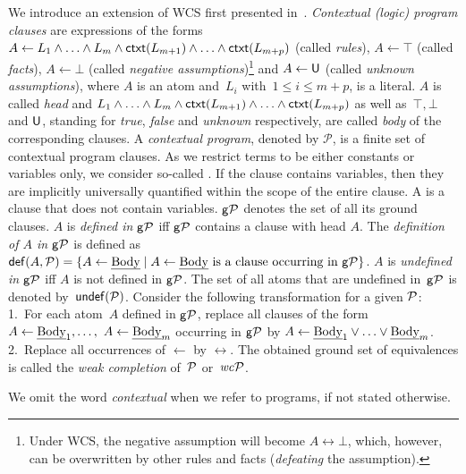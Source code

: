 \documentclass[12pt]{article}
\begin{document}
We introduce an extension of WCS first presented in~\cite{dietz:hoelldobler:pereira:2017}. 
\textit{Contextual (logic) program clauses}
are expressions of the forms $A  \leftarrow  L_1 \land \ldots \land L_m \land
\mathsf{ctxt}(L_{m+1}) \land \ldots \land \mathsf{ctxt}(L_{m+p})$ (called
\textit{rules}), $A \leftarrow \top$ (called \textit{facts}), $A \leftarrow \bot$ (called
\textit{negative assumptions})\footnote{Under WCS, the negative
assumption will become $A \leftrightarrow \bot$, which, however, can be overwritten by other rules and facts (\textit{defeating} the assumption).} and $A \leftarrow \mathsf{U}$ (called
\textit{unknown assumptions}), where
$A$ is an atom and~$L_i$ with~$1 \leq i \leq m+p$, is a literal.
$A$ is called \textit{head}
and $L_1 \land \ldots \land L_m \land
\mathsf{ctxt}(L_{m+1}) \land \ldots \land \mathsf{ctxt}(L_{m+p})$ as well as~$\top, \bot$
and $\mathsf{U}$,
standing for \textit{true}, \textit{false} and \textit{unknown} respectively, are
called \textit{body} of the corresponding clauses.  A
\textit{contextual program}, denoted by $\mathcal P$,
is a finite set of contextual program clauses.
As we restrict terms to be either constants or variables only, we consider so-called .
If the clause contains variables, then they are implicitly universally quantified within the scope of the entire clause. 
A  is a clause that does not contain variables.
$\mathsf{g} {\cal P}$ denotes the set of all its ground clauses.
$A$ is \textit{defined in $\mathsf{g} {\cal P}$}  iff $\mathsf{g} {\cal P}$ contains a clause with head $A$.
The \textit{definition of $A$ in $\mathsf{g} {\cal P}$} is defined as $\mathsf{def}(A,{\cal P})
= \{ A \leftarrow \mbox{\em Body} \mid A \leftarrow \mbox{\em Body} \mbox{ is a clause
occurring in } \mathsf{g} {\cal P}\}$.
$A$ is \textit{undefined in $\mathsf{g} {\cal P}$} iff $A$ is not defined in $\mathsf{g} {\cal P}$.
The set of all atoms that are undefined in~$\mathsf{g} {\cal P}$ is denoted by~$\mathsf{undef}({\cal P})$.
Consider the following transformation for a given ${\cal P}$:
1.\ For each atom~$A$ defined in $\mathsf{g} {\cal P}$, replace
  all clauses of the form $A \leftarrow \mbox{\em Body}_1, \ldots,$ $A \leftarrow
  \mbox{\em Body}_m$ occurring in $\mathsf{g} {\cal P}$ by $ A \leftarrow \mbox{\em Body}_1 \vee
  \ldots \vee \mbox{\em Body}_m$. 2.\ Replace all occurrences of $\leftarrow$ by $\leftrightarrow$.
The obtained ground set of equivalences is called the \textit{weak completion}
of~${\cal P}$ or~$\mathit{wc}{\cal P}$.

We omit the word \textit{contextual} when we refer to programs, if not stated otherwise.
\end{document}
